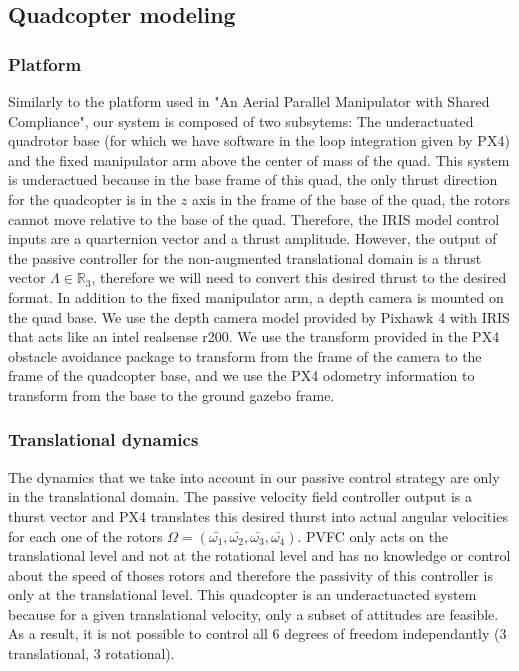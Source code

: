 \subsection{Quadcopter modeling}
\subsubsection{Platform}
Similarly to the platform used in "An Aerial Parallel Manipulator with Shared Compliance", our system is composed of two subsytems: The underactuated quadrotor base (for which we have software in the loop integration given by PX4) and the fixed manipulator arm above the center of mass of the quad.
This system is underactued because in the base frame of this quad, the only thrust direction for the quadcopter is in the $z$ axis in the frame of the base of the quad, the rotors cannot move relative to the base of the quad. Therefore, the IRIS model control inputs are a quarternion vector and a thrust amplitude. However, the output of the passive controller for the non-augmented translational domain is a thrust vector $\Lambda \in\mathbb R_3 $, therefore we will need to convert this desired thrust to the desired format.
In addition to the fixed manipulator arm, a depth camera is mounted on the quad base. We use the depth camera model provided by Pixhawk 4 with IRIS that acts like an intel realsense r200. We use the transform provided in the PX4 obstacle avoidance package to transform from the frame of the camera to the frame of the quadcopter base, and we use the PX4 odometry information to transform from the base to the ground gazebo frame.

\subsubsection{Translational dynamics}

The dynamics that we take into account in our passive control strategy are only in the translational domain. The passive velocity field controller output is a thurst vector and PX4 translates this desired thurst into actual angular velocities for each one of the rotors 
$\Omega = (\bar{\omega_1}, \bar{\omega_2}, \bar{\omega_3}, \bar{\omega_4})$. PVFC only acts on the translational level and not at the rotational level and has no knowledge or control about the speed of thoses rotors and therefore the passivity of this controller is only at the translational level. 
This quadcopter is an underactuacted system because for a given translational velocity, only a subset of attitudes are feasible. As a result, it is not possible to control all 6 degrees of freedom independantly (3 translational, 3 rotational).
 
